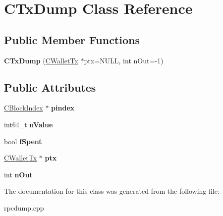 \hypertarget{class_c_tx_dump}{}\section{C\+Tx\+Dump Class Reference}
\label{class_c_tx_dump}
\subsection*{Public Member Functions}
\begin{DoxyCompactItemize}
\item 
\mbox{\label{class_c_tx_dump_a24c253b4afd04471ca984a5cda09c4b6}} 
{\bfseries C\+Tx\+Dump} (\mbox{\hyperlink{class_c_wallet_tx}{C\+Wallet\+Tx}} $\ast$ptx=N\+U\+LL, int n\+Out=-\/1)
\end{DoxyCompactItemize}
\subsection*{Public Attributes}
\begin{DoxyCompactItemize}
\item 
\mbox{\label{class_c_tx_dump_a98da78bae1b040ff7e8f33cd7a91ccd0}} 
\mbox{\hyperlink{class_c_block_index}{C\+Block\+Index}} $\ast$ {\bfseries pindex}
\item 
\mbox{\label{class_c_tx_dump_afca3ced942672136928b8f2cefc77ee7}} 
int64\+\_\+t {\bfseries n\+Value}
\item 
\mbox{\label{class_c_tx_dump_ab9414670ba3167741093b69bf8ff3d3c}} 
bool {\bfseries f\+Spent}
\item 
\mbox{\label{class_c_tx_dump_a35bc70e8a048c6a5c7d7d75007d23d24}} 
\mbox{\hyperlink{class_c_wallet_tx}{C\+Wallet\+Tx}} $\ast$ {\bfseries ptx}
\item 
\mbox{\label{class_c_tx_dump_a4b59015f367c546b94f2710c8410f3df}} 
int {\bfseries n\+Out}
\end{DoxyCompactItemize}


The documentation for this class was generated from the following file\+:\begin{DoxyCompactItemize}
\item 
rpcdump.\+cpp\end{DoxyCompactItemize}
